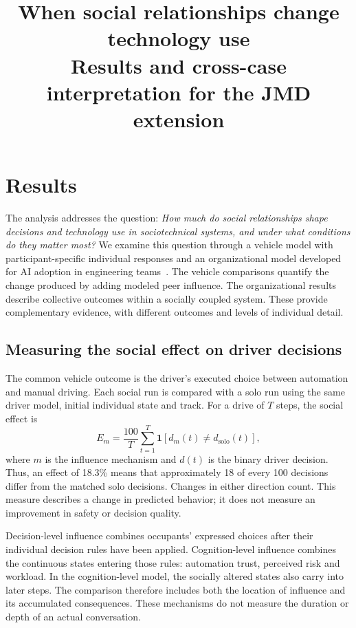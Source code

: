 \documentclass[11pt]{article}
\title{When social relationships change technology use\\
  \large Results and cross-case interpretation for the JMD extension}
\author{}
\date{}
\begin{document}
\maketitle
\vspace{-2em}

\section{Results}
\label{sec:results}

The analysis addresses the question: \emph{How much do social relationships
shape decisions and technology use in sociotechnical systems, and under what
conditions do they matter most?} We examine this question through a vehicle
model with participant-specific individual responses and an organizational
model developed for AI adoption in engineering teams~\cite{noorghasemi2026}.
The vehicle comparisons quantify the change produced by adding modeled peer
influence. The organizational results describe collective outcomes within a
socially coupled system. These provide complementary evidence, with different
outcomes and levels of individual detail.

\subsection{Measuring the social effect on driver decisions}
\label{sec:measure}

The common vehicle outcome is the driver's executed choice between automation
and manual driving. Each social run is compared with a solo run using the same
driver model, initial individual state and track. For a drive of $T$ steps,
the social effect is
\begin{equation}
  E_m = \frac{100}{T}\sum_{t=1}^{T}
    \mathbf{1}\!\left[d_m(t)\ne d_{\mathrm{solo}}(t)\right],
  \label{eq:social-effect}
\end{equation}
where $m$ is the influence mechanism and $d(t)$ is the binary driver decision.
Thus, an effect of 18.3\% means that approximately 18 of every 100 decisions
differ from the matched solo decisions. Changes in either direction count.
This measure describes a change in predicted behavior; it does not measure an
improvement in safety or decision quality.

Decision-level influence combines occupants' expressed choices after their
individual decision rules have been applied. Cognition-level influence combines
the continuous states entering those rules: automation trust, perceived risk
and workload. In the cognition-level model, the socially altered states also
carry into later steps. The comparison therefore includes both the location of
influence and its accumulated consequences. These mechanisms do not measure
the duration or depth of an actual conversation.
\end{document}
